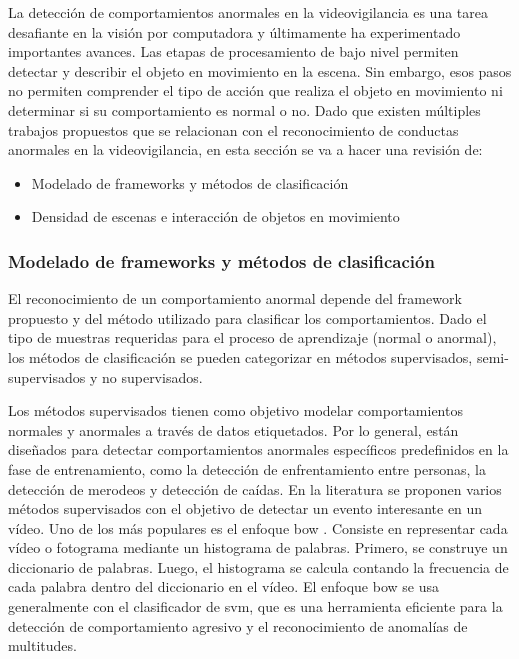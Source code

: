 La detección de comportamientos anormales en la videovigilancia es una tarea desafiante en la visión por computadora y últimamente ha experimentado importantes avances. Las etapas de procesamiento de bajo nivel permiten detectar y describir el objeto en movimiento en la escena. Sin embargo, esos pasos no permiten comprender el tipo de acción que realiza el objeto en movimiento ni determinar si su comportamiento es normal o no. Dado que existen múltiples trabajos propuestos que se relacionan con el reconocimiento de conductas anormales en la videovigilancia, en esta sección se va a hacer una revisión de:

\begin{itemize}
    \item Modelado de frameworks y métodos de clasificación
    \item Densidad de escenas e interacción de objetos en movimiento
\end{itemize}

\subsubsection*{Modelado de frameworks y métodos de clasificación}
\label{subsubsec:modelado-frameworks-métodos-clasificación}

El reconocimiento de un comportamiento anormal depende del framework propuesto y del método utilizado para clasificar los comportamientos. Dado el tipo de muestras requeridas para el proceso de aprendizaje (normal o anormal), los métodos de clasificación se pueden categorizar en métodos supervisados, semi-supervisados y no supervisados.

Los métodos supervisados tienen como objetivo modelar comportamientos normales y anormales a través de datos etiquetados. Por lo general, están diseñados para detectar comportamientos anormales específicos predefinidos en la fase de entrenamiento, como la detección de enfrentamiento entre personas, la detección de merodeos y detección de caídas. En la literatura se proponen varios métodos supervisados con el objetivo de detectar un evento interesante en un vídeo. Uno de los más populares es el enfoque \gls{bow} \cite{ACAMPORA2015130}. Consiste en representar cada vídeo o fotograma mediante un histograma de palabras. Primero, se construye un diccionario de palabras. Luego, el histograma se calcula contando la frecuencia de cada palabra dentro del diccionario en el vídeo. El enfoque \gls{bow} se usa generalmente con el clasificador de \gls{svm}, que es una herramienta eficiente para la detección de comportamiento agresivo y el reconocimiento de anomalías de multitudes.

